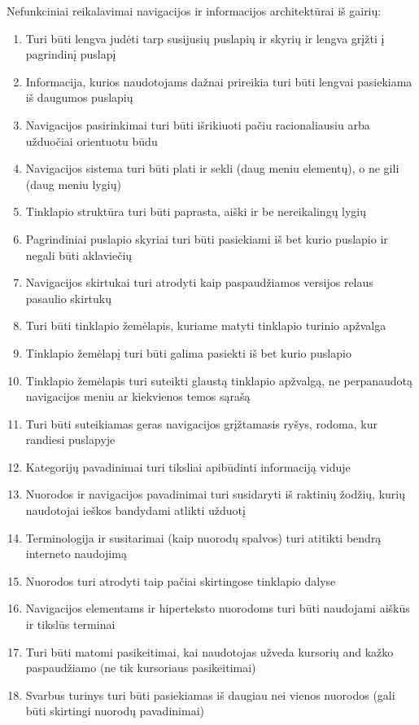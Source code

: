 \documentclass{VUMIFPSkursinis}
\begin{document}
Nefunkciniai reikalavimai navigacijos ir informacijos architektūrai iš gairių:
\begin{enumerate}
	\item Turi būti lengva judėti tarp susijusių puslapių ir skyrių ir lengva grįžti į pagrindinį puslapį
	\item Informacija, kurios naudotojams dažnai prireikia turi būti lengvai pasiekiama iš daugumos puslapių
	\item Navigacijos pasirinkimai turi būti išrikiuoti pačiu racionaliausiu arba užduočiai orientuotu būdu
	\item Navigacijos sistema turi būti plati ir sekli (daug meniu elementų), o ne gili (daug meniu lygių)
	\item Tinklapio struktūra turi būti paprasta, aiški ir be nereikalingų lygių
	\item Pagrindiniai puslapio skyriai turi būti pasiekiami iš bet kurio puslapio ir negali būti aklaviečių
	\item Navigacijos skirtukai turi atrodyti kaip paspaudžiamos versijos relaus pasaulio skirtukų
	\item Turi būti tinklapio žemėlapis, kuriame matyti tinklapio turinio apžvalga
	\item Tinklapio žemėlapį turi būti galima pasiekti iš bet kurio puslapio
	\item Tinklapio žemėlapis turi suteikti glaustą tinklapio apžvalgą, ne perpanaudotą navigacijos meniu ar kiekvienos temos sąrašą
	\item Turi būti suteikiamas geras navigacijos grįžtamasis ryšys, rodoma, kur randiesi puslapyje
	\item Kategorijų pavadinimai turi tiksliai apibūdinti informaciją viduje
	\item Nuorodos ir navigacijos pavadinimai turi susidaryti iš raktinių žodžių, kurių naudotojai ieškos bandydami atlikti užduotį
	\item Terminologija ir susitarimai (kaip nuorodų spalvos) turi atitikti bendrą interneto naudojimą
	\item Nuorodos turi atrodyti taip pačiai skirtingose tinklapio dalyse
	\item Navigacijos elementams ir hiperteksto nuorodoms turi būti naudojami aiškūs ir tikslūs terminai
	\item Turi būti matomi pasikeitimai, kai naudotojas užveda kursorių and kažko paspaudžiamo (ne tik kursoriaus pasikeitimai)
	\item Svarbus turinys turi būti pasiekiamas iš daugiau nei vienos nuorodos (gali būti skirtingi nuorodų pavadinimai)

\end{enumerate}
\end{document}
